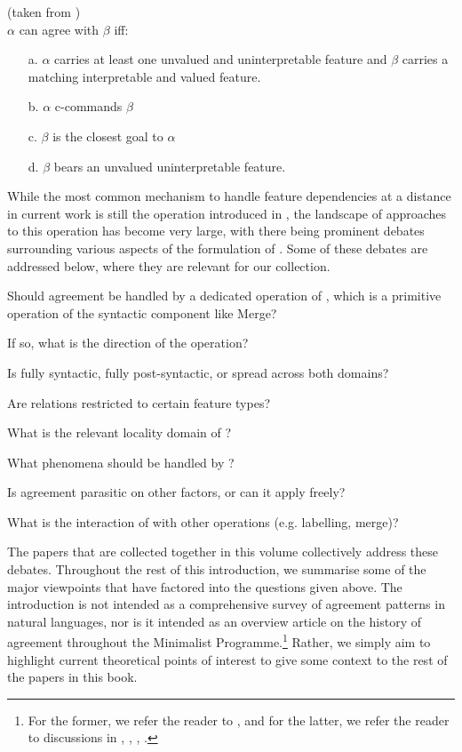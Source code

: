\documentclass[output=paper
,modfonts
,nonflat]{langsci/langscibook}
\begin{document}
\begin{exe}
	\ex \agr {} (taken from \citealp{Zeijlstra2012})\\
	$\alpha$ can agree with $\beta$ iff:
	\begin{itemize}
		\item[a.] $\alpha$ carries at least one unvalued and uninterpretable feature and $\beta$ carries a matching interpretable and valued feature.
		\item[b.] $\alpha$ c-commands $\beta$
		\item[c.] $\beta$ is the closest goal to $\alpha$
		\item[d.] {$\beta$ bears an unvalued uninterpretable feature.}
	\end{itemize} \label{agr}
\end{exe}
While the most common mechanism to handle feature dependencies at a distance in current work is still the operation {\agr} introduced in \citet{Chomsky2000}, the landscape of approaches to this operation has become very large, with there being prominent debates surrounding various aspects of the formulation of \agr.
Some of these debates are addressed below, where they are relevant for our collection.
\begin{compactenum}
	\item Should agreement be handled by a dedicated operation of \agr, which is a primitive operation of the syntactic component like Merge?
	\item If so, what is the direction of the \agr {} operation?
	\item Is \agr {} fully syntactic, fully post-syntactic, or spread across both domains?
	\item Are \agr {} relations restricted to certain feature types?
	\item What is the relevant locality domain of \agr?
	\item What phenomena should be handled by \agr?
	\item Is agreement parasitic on other factors, or can it apply freely?
	\item What is the interaction of \agr {} with other operations (e.g. labelling, merge)?
\end{compactenum}
The papers that are collected together in this volume collectively address these debates. Throughout the rest of this introduction, we summarise some of the major viewpoints that have factored into the questions given above.
The introduction is not intended as a comprehensive survey of agreement patterns in natural languages, nor is it intended as an overview article on the history of agreement throughout the Minimalist Programme.\footnote{For the former, we refer the reader to \citet{corbett2006}, and for the latter, we refer the reader to discussions in \citet{Fuss2005}, \citet{baker2008}, \citet{Miyagawa2010}, \citet{preminger2015}.}
Rather, we simply aim to highlight current theoretical points of interest to give some context to the rest of the papers in this book.
\end{document}
